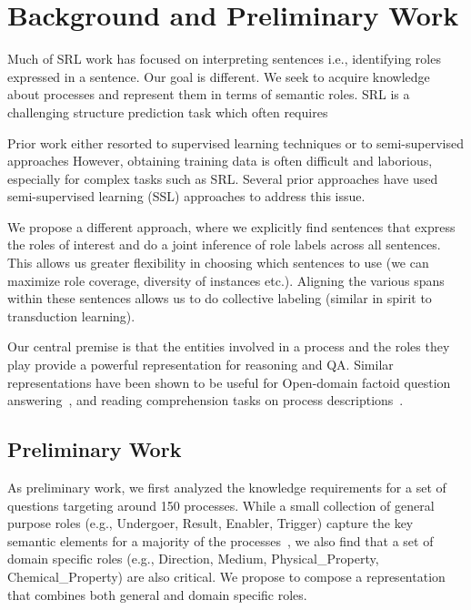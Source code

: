 \section{Background and Preliminary Work}

Much of SRL work has focused on interpreting sentences i.e., identifying roles expressed in a sentence.
Our goal is different. 
We seek to acquire knowledge about processes and represent them in terms of semantic roles.
SRL is a challenging structure prediction task which often requires 

Prior work either resorted to supervised learning techniques or to semi-supervised approaches 
However, obtaining training data is often difficult and laborious, especially for complex tasks such as SRL.
Several prior approaches have used semi-supervised learning (SSL) approaches to address this issue. 

We propose a different approach, where we explicitly find sentences that express the roles of interest and do a joint inference of role labels across all sentences. 
This allows us greater flexibility in choosing which sentences to use (we can maximize role coverage, diversity of instances etc.).
Aligning the various spans within these sentences allows us to do collective labeling (similar in spirit to transduction learning).


Our central premise is that the entities involved in a process and the roles they play provide a powerful representation for reasoning and QA. 
Similar representations have been shown to be useful for Open-domain factoid question answering~\cite{shen2007using,pizzato2008indexing}, 
and reading comprehension tasks on process descriptions~\cite{berantSrikumar14}.


\subsection{Preliminary Work}

As preliminary work, we first analyzed the knowledge requirements for a set of questions targeting around 150 processes. 
While a small collection of general purpose roles (e.g., Undergoer, Result, Enabler, Trigger) capture the key semantic elements for a 
majority of the processes~\cite{louvan2015:kcap}, we also find that a set of domain specific roles (e.g., Direction, Medium, Physical\_Property, Chemical\_Property) are also critical. We propose to compose a representation that combines both general and domain specific roles. 

